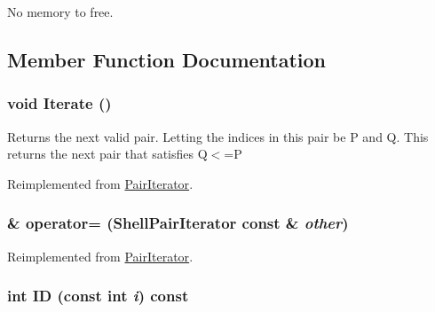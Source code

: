 No memory to free. 

\subsection{Member Function Documentation}
\hypertarget{classJKBuilder_1_1ShellPairIterator_a7874a07e98b52f4f147cde6f39353bae}{
\subsubsection[{Iterate}]{\setlength{\rightskip}{0pt plus 5cm}void Iterate ()}}
\label{classJKBuilder_1_1ShellPairIterator_a7874a07e98b52f4f147cde6f39353bae}


Returns the next valid pair. Letting the indices in this pair be P and Q. This returns the next pair that satisfies Q$<$=P 

Reimplemented from \hyperlink{classJKBuilder_1_1PairIterator_a7874a07e98b52f4f147cde6f39353bae}{PairIterator}.\hypertarget{classJKBuilder_1_1ShellPairIterator_af3001050bade3a939d83971d1a3f47e7}{
\subsubsection[{operator=}]{ \& operator= ({\bf ShellPairIterator} const \& {\em other})}}
\label{classJKBuilder_1_1ShellPairIterator_af3001050bade3a939d83971d1a3f47e7}


Reimplemented from \hyperlink{classJKBuilder_1_1PairIterator_a698aa7b3d6495bd74dcff5b93be868a8}{PairIterator}.\hypertarget{classJKBuilder_1_1PairIterator_a370ad37c854fbbf6421ebf9ab35cd027}{
\subsubsection[{ID}]{\setlength{\rightskip}{0pt plus 5cm}int ID (const int {\em i}) const}}
\label{classJKBuilder_1_1PairIterator_a370ad37c854fbbf6421ebf9ab35cd027}


